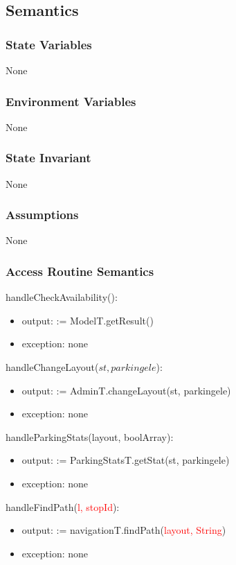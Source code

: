 \documentclass[12pt, titlepage]{article}
\begin{document}
\subsection{Semantics}

\subsubsection{State Variables}
None

\subsubsection{Environment Variables}
None

\subsubsection{State Invariant}
None

\subsubsection{Assumptions}
None

\subsubsection{Access Routine Semantics}

\noindent handleCheckAvailability():
\begin{itemize}
    \item output:  := ModelT.getResult()
    \item exception: none
\end{itemize}

\noindent handleChangeLayout($st, parkingele$):
\begin{itemize}
    \item output:  := AdminT.changeLayout(st, parkingele)
    \item exception: none
\end{itemize}


\noindent handleParkingStats(layout, boolArray):
\begin{itemize}
    \item output:  := ParkingStatsT.getStat(st, parkingele)
    \item exception: none
\end{itemize}



\noindent handleFindPath(\textcolor{red}{l, stopId}):
\begin{itemize}
    \item output:  := navigationT.findPath(\textcolor{red}{layout,
    String})
    \item exception: none
\end{itemize}
\end{document}
